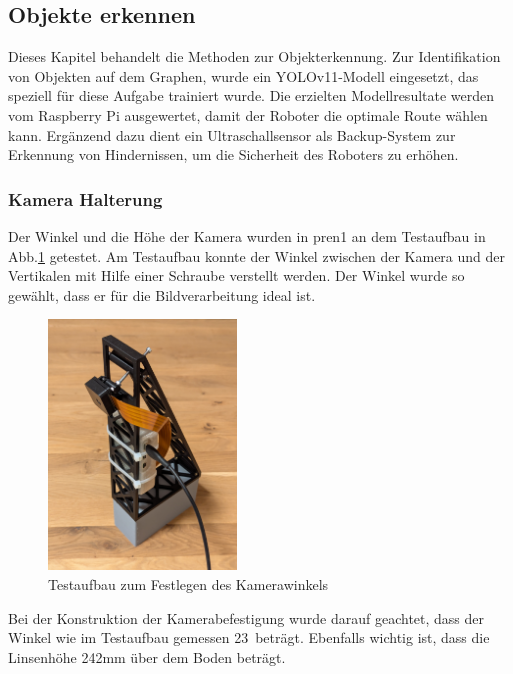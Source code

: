 
\subsection{Objekte erkennen}

Dieses Kapitel behandelt die Methoden zur Objekterkennung. Zur Identifikation von Objekten auf dem Graphen, wurde ein YOLOv11-Modell eingesetzt, das speziell für diese Aufgabe trainiert wurde. Die erzielten Modellresultate werden vom Raspberry Pi ausgewertet, damit der Roboter die optimale Route wählen kann. Ergänzend dazu dient ein Ultraschallsensor als Backup-System zur Erkennung von Hindernissen, um die Sicherheit des Roboters zu erhöhen. 

\subsubsection{Kamera Halterung}
\label{Kamera Halter}

Der Winkel und die Höhe der Kamera wurden in \acrshort{pren1} an dem Testaufbau in Abb.\ref{fig:Testaufbau zum Festlegen des Kamerawinkels} getestet. Am Testaufbau konnte der Winkel zwischen der Kamera und der Vertikalen mit Hilfe einer Schraube verstellt werden. Der Winkel wurde so gewählt, dass er für die Bildverarbeitung ideal ist. 

\begin{figure}[H]
\centering
\includegraphics[width=5cm]{assets/MT/camer_tower_2.png}
\caption{Testaufbau zum Festlegen des Kamerawinkels}
\label{fig:Testaufbau zum Festlegen des Kamerawinkels}
\end{figure}


Bei der Konstruktion der Kamerabefestigung wurde darauf geachtet, dass der Winkel wie im Testaufbau gemessen 23\textdegree\ beträgt. Ebenfalls wichtig ist, dass die Linsenhöhe 242mm über dem Boden beträgt. 

